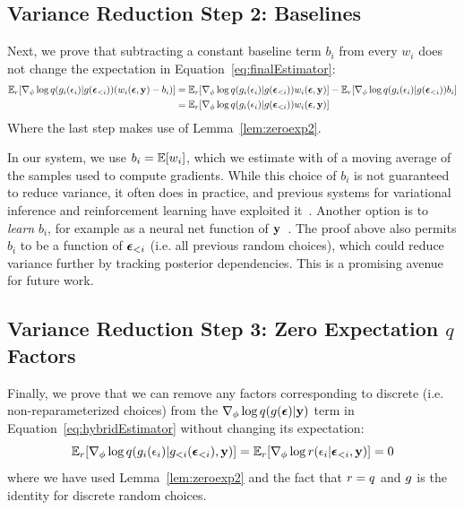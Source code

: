 \subsection{Variance Reduction Step 2: Baselines}

Next, we prove that subtracting a constant baseline term $b_i$ from every $w_i$ does not change the expectation in Equation~\ref{eq:finalEstimator}:
\begin{align*}
\expect_\reparamDist [ \gradparams \log \guide(\reparamXform_i(\reparamVar_i) | \reparamXform(\reparamVars_{<i})) (w_i(\reparamVars, \observedVars) - b_i) ]
%
&= \expect_\reparamDist [ \gradparams \log \guide(\reparamXform_i(\reparamVar_i) | \reparamXform(\reparamVars_{<i})) w_i(\reparamVars, \observedVars) ] - \expect_\reparamDist[ \gradparams \log \guide(\reparamXform_i(\reparamVar_i) | \reparamXform(\reparamVars_{<i})) b_i ]\\
%
&= \expect_\reparamDist [ \gradparams \log \guide(\reparamXform_i(\reparamVar_i) | \reparamXform(\reparamVars_{<i})) w_i(\reparamVars, \observedVars) ] 
\end{align*}
Where the last step makes use of Lemma~\ref{lem:zeroexp2}.

In our system, we use $b_i = \mathbb{E}[ w_i ]$, which we estimate with of a moving average of the samples used to compute gradients. While this choice of $b_i$ is not guaranteed to reduce variance, it often does in practice, and previous systems for variational inference and reinforcement learning have exploited it~\cite{BBVI,StochasticComputationGraphs,VarianceReduction}. Another option is to \emph{learn} $b_i$, for example as a neural net function of $\mathbf{y}$~\cite{NVIL}. The proof above also permits $b_i$ to be a function of $\bm{\epsilon}_{<i}$ (i.e. all previous random choices), which could reduce variance further by tracking posterior dependencies. This is a promising avenue for future work.

\subsection{Variance Reduction Step 3: Zero Expectation $q$ Factors}

Finally, we prove that we can remove any factors corresponding to discrete (i.e. non-reparameterized choices) from the $\nabla_\phi \log q(g(\bm{\epsilon}) | \mathbf{y})$ term in Equation~\ref{eq:hybridEstimator} without changing its expectation:
\begin{equation*}
\expect_\reparamDist [ \gradparams \log \guide(\reparamXform_i(\reparamVar_i) | \reparamXform_{<i}(\reparamVars_{<i}), \observedVars) ]
%
= \expect_\reparamDist [ \gradparams \log \reparamDist(\reparamVar_i | \reparamVars_{<i}, \observedVars) ]
%
= 0
\end{equation*}
where we have used Lemma~\ref{lem:zeroexp2} and the fact that $r = q$ and $g$ is the identity for discrete random choices.
